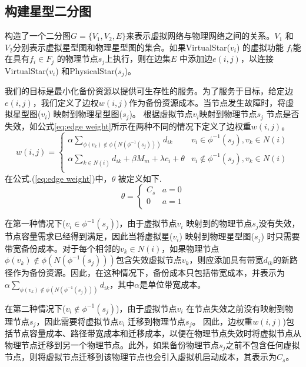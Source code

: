 \subsection{构建星型二分图}
构造了一个二分图$G=\{V_1,V_2,E\}$来表示虚拟网络与物理网络之间的关系。$V_1$ 和$V_2$分别表示虚拟星型图和物理星型图的集合。如果VirtualStar($v_i$) 的虚拟功能 $f_i$能在具有${f_i} \in {F_j}$ 的物理节点$s_j$上执行，则在边集$E$ 中添加边$e(i,j)$，以连接VirtualStar($v_i$) 和PhysicalStar($s_j$)。

我们的目标是最小化备份资源以提供可生存性的服务。为了服务于目标，给定边$e(i,j)$，我们定义了边权$w(i,j)$作为备份资源成本。当节点发生故障时，将虚拟星型图($v_i$) 映射到物理星型图($s_j$)。 根据虚拟节点$v_i$映射到物理节点$s_j$ 节点是否失效，如公式\ref{eq:edge weight}所示在两种不同的情况下定义了边权重$w(i,j)$。
\begin{equation}
w(i,j) = \left\{ {\begin{array}{*{20}{c}}
   { \alpha \sum\limits_{\phi ({v_k}) \notin \phi (N({\phi ^{ - 1}}({s_j})))} {{d_{ik}}} } & {{v_i} \in {\phi ^{ - 1}}({s_j}),v_k \in N(i)}  \\
   {\alpha \sum\limits_{k \in N(i)} {{d_{ik}}}  + \beta {M_m} + \lambda {c_i} + \theta } & {{v_i} \notin {\phi ^{ - 1}}({s_j}),v_k \in N(i)}  \\
\end{array}} \right.
\label{eq:edge weight}
\end{equation}
在公式.(\ref{eq:edge weight})中，$\theta$ 被定义如下.
\begin{equation}
\theta  = \left\{ {\begin{array}{*{20}{c}}
   {{C_s}} & {a = 0}  \\
   0 & {a = 1}  \\
\end{array}} \right.
\end{equation}

在第一种情况下(${v_i} \in {\phi ^{ - 1}}({s_j})$)，由于虚拟节点$v_i$ 映射到的物理节点$s_j$没有失效，节点容量需求已经得到满足，因此当将虚拟星($v_i$) 映射到物理星型图($s_j$) 时只需要带宽备份成本。对于每个相邻的$v_k \in N(i)$，如果物理节点${\phi ({v_k}) \notin \phi (N({\phi ^{ - 1}}({s_j})))}$包含失效虚拟节点$v_k$，则应添加具有带宽$d_{ik}$的新路径作为备份资源。因此，在这种情况下，备份成本只包括带宽成本，并表示为$ { \alpha \sum\limits_{\phi ({v_k}) \notin \phi (N({\phi ^{ - 1}}({s_j})))} {{d_{ik}}} }$，其中$\alpha$是单位带宽成本。

在第二种情况下(${v_i} \notin {\phi ^{ - 1}}({s_j})$)，由于虚拟节点$v_i$ 在节点失效之前没有映射到物理节点$s_j$，因此需要将虚拟节点$v_i$ 迁移到物理节点$s_j$。 因此，边权重$w(i,j)$)包括节点容量成本、路径带宽成本和迁移成本，以便在物理节点失效时将虚拟节点从物理节点迁移到另一个物理节点。此外，如果备份物理节点$s_j$之前不包含任何虚拟节点，则将虚拟节点迁移到该物理节点也会引入虚拟机启动成本，其表示为$C_s$。


